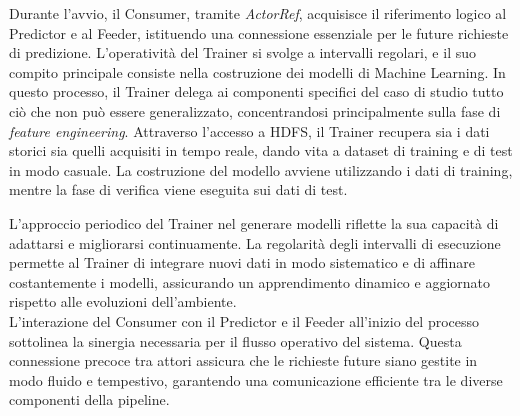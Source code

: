Durante l'avvio, il Consumer, tramite \textit{ActorRef}, acquisisce il riferimento logico al Predictor e al Feeder, istituendo una connessione essenziale per le future richieste di predizione.
L'operatività del Trainer si svolge a intervalli regolari, e il suo compito principale consiste nella costruzione dei modelli di Machine Learning.
In questo processo, il Trainer delega ai componenti specifici del caso di studio tutto ciò che non può essere generalizzato, concentrandosi principalmente sulla fase di \textit{feature engineering}.
Attraverso l'accesso a HDFS, il Trainer recupera sia i dati storici sia quelli acquisiti in tempo reale, dando vita a dataset di training e di test in modo casuale.
La costruzione del modello avviene utilizzando i dati di training, mentre la fase di verifica viene eseguita sui dati di test.

L'approccio periodico del Trainer nel generare modelli riflette la sua capacità di adattarsi e migliorarsi continuamente.
La regolarità degli intervalli di esecuzione permette al Trainer di integrare nuovi dati in modo sistematico e di affinare costantemente i modelli, assicurando un apprendimento dinamico e aggiornato rispetto alle evoluzioni dell'ambiente. \\
L'interazione del Consumer con il Predictor e il Feeder all'inizio del processo sottolinea la sinergia necessaria per il flusso operativo del sistema.
Questa connessione precoce tra attori assicura che le richieste future siano gestite in modo fluido e tempestivo, garantendo una comunicazione efficiente tra le diverse componenti della pipeline. 

